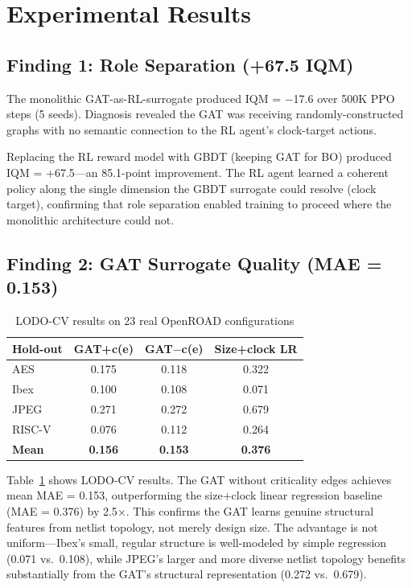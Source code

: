 \documentclass[conference]{IEEEtran}
\begin{document}
\section{Experimental Results}

\subsection{Finding 1: Role Separation (+67.5 IQM)}

The monolithic GAT-as-RL-surrogate produced IQM = $-$17.6 over 500K PPO steps
(5 seeds). Diagnosis revealed the GAT was receiving randomly-constructed graphs
with no semantic connection to the RL agent's clock-target actions.

Replacing the RL reward model with GBDT (keeping GAT for BO) produced
IQM = +67.5—an 85.1-point improvement. The RL agent learned a coherent
policy along the single dimension the GBDT surrogate could resolve (clock
target), confirming that role separation enabled training to proceed where
the monolithic architecture could not.

\subsection{Finding 2: GAT Surrogate Quality (MAE = 0.153)}

\begin{table}[t]
\centering
\caption{LODO-CV results on 23 real OpenROAD configurations}
\label{tab:lodo}
\begin{tabular}{lccc}
\toprule
\textbf{Hold-out} & \textbf{GAT+c(e)} & \textbf{GAT$-$c(e)} & \textbf{Size+clock LR} \\
\midrule
AES      & 0.175 & 0.118 & 0.322 \\
Ibex     & 0.100 & 0.108 & 0.071 \\
JPEG     & 0.271 & 0.272 & 0.679 \\
RISC-V   & 0.076 & 0.112 & 0.264 \\
\midrule
\textbf{Mean} & \textbf{0.156} & \textbf{0.153} & \textbf{0.376} \\
\bottomrule
\end{tabular}
\end{table}

Table~\ref{tab:lodo} shows LODO-CV results. The GAT without criticality edges
achieves mean MAE = 0.153, outperforming the size+clock linear regression baseline
(MAE = 0.376) by 2.5$\times$. This confirms the GAT learns genuine structural
features from netlist topology, not merely design size. The advantage is not
uniform—Ibex's small, regular structure is well-modeled by simple regression
(0.071 vs.\ 0.108), while JPEG's larger and more diverse netlist topology
benefits substantially from the GAT's structural representation
(0.272 vs.\ 0.679).
\end{document}
